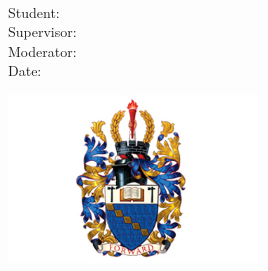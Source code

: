 %
%
%
\begin{titlepage}
  \begin{center}
    \vspace*{1cm}

    \Huge
    \textbf{\@title}\\
    \vspace{0.5cm}
    \LARGE
    \subtitle{}

    \Large
    \vspace{3cm}
    \degreeTitle{}

    \vspace{2cm}
    Student: \@author\\
    Supervisor: \supervisor{}\\
    Moderator: \moderator{}\\
    Date: \@date \\

    \vfill

    \includegraphics[width=0.5\textwidth]{assets/aston.jpeg}

    \vspace{0.5cm}
    \institution{}\\
  \end{center}
\end{titlepage}
